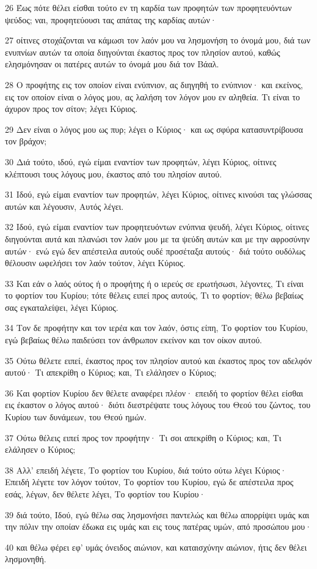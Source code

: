\par 26 Έως πότε θέλει είσθαι τούτο εν τη καρδία των προφητών των προφητευόντων ψεύδος; ναι, προφητεύουσι τας απάτας της καρδίας αυτών·
\par 27 οίτινες στοχάζονται να κάμωσι τον λαόν μου να λησμονήση το όνομά μου, διά των ενυπνίων αυτών τα οποία διηγούνται έκαστος προς τον πλησίον αυτού, καθώς ελησμόνησαν οι πατέρες αυτών το όνομά μου διά τον Βάαλ.
\par 28 Ο προφήτης εις τον οποίον είναι ενύπνιον, ας διηγηθή το ενύπνιον· και εκείνος, εις τον οποίον είναι ο λόγος μου, ας λαλήση τον λόγον μου εν αληθεία. Τι είναι το άχυρον προς τον σίτον; λέγει Κύριος.
\par 29 Δεν είναι ο λόγος μου ως πυρ; λέγει ο Κύριος· και ως σφύρα κατασυντρίβουσα τον βράχον;
\par 30 Διά τούτο, ιδού, εγώ είμαι εναντίον των προφητών, λέγει Κύριος, οίτινες κλέπτουσι τους λόγους μου, έκαστος από του πλησίον αυτού.
\par 31 Ιδού, εγώ είμαι εναντίον των προφητών, λέγει Κύριος, οίτινες κινούσι τας γλώσσας αυτών και λέγουσιν, Αυτός λέγει.
\par 32 Ιδού, εγώ είμαι εναντίον των προφητευόντων ενύπνια ψευδή, λέγει Κύριος, οίτινες διηγούνται αυτά και πλανώσι τον λαόν μου με τα ψεύδη αυτών και με την αφροσύνην αυτών· ενώ εγώ δεν απέστειλα αυτούς ουδέ προσέταξα αυτούς· διά τούτο ουδόλως θέλουσιν ωφελήσει τον λαόν τούτον, λέγει Κύριος.
\par 33 Και εάν ο λαός ούτος ή ο προφήτης ή ο ιερεύς σε ερωτήσωσι, λέγοντες, Τι είναι το φορτίον του Κυρίου; τότε θέλεις ειπεί προς αυτούς, Τι το φορτίον; θέλω βεβαίως σας εγκαταλείψει, λέγει Κύριος.
\par 34 Τον δε προφήτην και τον ιερέα και τον λαόν, όστις είπη, Το φορτίον του Κυρίου, εγώ βεβαίως θέλω παιδεύσει τον άνθρωπον εκείνον και τον οίκον αυτού.
\par 35 Ούτω θέλετε ειπεί, έκαστος προς τον πλησίον αυτού και έκαστος προς τον αδελφόν αυτού· Τι απεκρίθη ο Κύριος; και, Τι ελάλησεν ο Κύριος;
\par 36 Και φορτίον Κυρίου δεν θέλετε αναφέρει πλέον· επειδή το φορτίον θέλει είσθαι εις έκαστον ο λόγος αυτού· διότι διεστρέψατε τους λόγους του Θεού του ζώντος, του Κυρίου των δυνάμεων, του Θεού ημών.
\par 37 Ούτω θέλεις ειπεί προς τον προφήτην· Τι σοι απεκρίθη ο Κύριος; και, Τι ελάλησεν ο Κύριος;
\par 38 Αλλ' επειδή λέγετε, Το φορτίον του Κυρίου, διά τούτο ούτω λέγει Κύριος· Επειδή λέγετε τον λόγον τούτον, Το φορτίον του Κυρίου, εγώ δε απέστειλα προς εσάς, λέγων, δεν θέλετε λέγει, Το φορτίον του Κυρίου·
\par 39 διά τούτο, Ιδού, εγώ θέλω σας λησμονήσει παντελώς και θέλω απορρίψει υμάς και την πόλιν την οποίαν έδωκα εις υμάς και εις τους πατέρας υμών, από προσώπου μου·
\par 40 και θέλω φέρει εφ' υμάς όνειδος αιώνιον, και καταισχύνην αιώνιον, ήτις δεν θέλει λησμονηθή.

